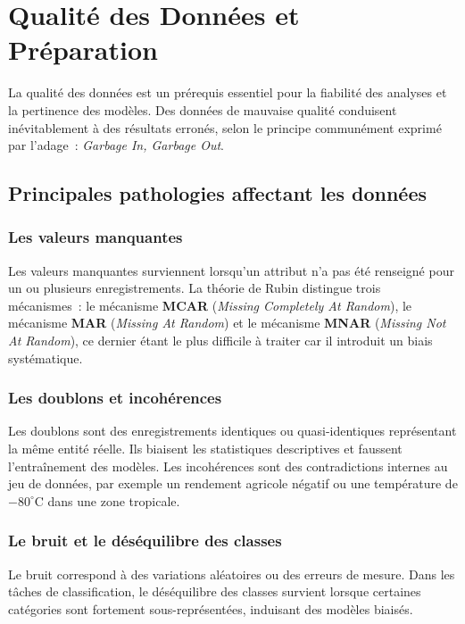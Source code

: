 \section{Qualité des Données et Préparation}

La qualité des données est un prérequis essentiel pour la fiabilité des analyses et la pertinence des modèles. Des données de mauvaise qualité conduisent inévitablement à des résultats erronés, selon le principe communément exprimé par l'adage~: \textit{Garbage In, Garbage Out}.

\subsection{Principales pathologies affectant les données}

\subsubsection{Les valeurs manquantes}

Les valeurs manquantes surviennent lorsqu'un attribut n'a pas été renseigné pour un ou plusieurs enregistrements. La théorie de Rubin distingue trois mécanismes~: le mécanisme \textbf{MCAR} (\textit{Missing Completely At Random}), le mécanisme \textbf{MAR} (\textit{Missing At Random}) et le mécanisme \textbf{MNAR} (\textit{Missing Not At Random}), ce dernier étant le plus difficile à traiter car il introduit un biais systématique.

\subsubsection{Les doublons et incohérences}

Les doublons sont des enregistrements identiques ou quasi-identiques représentant la même entité réelle. Ils biaisent les statistiques descriptives et faussent l'entraînement des modèles. Les incohérences sont des contradictions internes au jeu de données, par exemple un rendement agricole négatif ou une température de $-80^\circ$C dans une zone tropicale.

\subsubsection{Le bruit et le déséquilibre des classes}

Le bruit correspond à des variations aléatoires ou des erreurs de mesure. Dans les tâches de classification, le déséquilibre des classes survient lorsque certaines catégories sont fortement sous-représentées, induisant des modèles biaisés.

